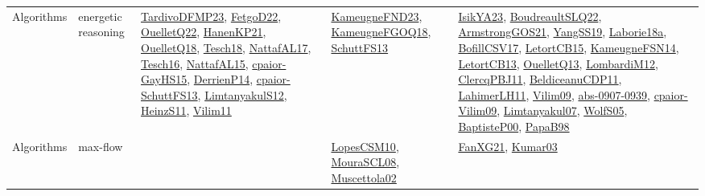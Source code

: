 {\begin{longtable}{lp{3cm}>{\raggedright}p{6cm}>{\raggedright}p{6cm}p{8cm}}
Algorithms & energetic reasoning & \href{papers/TardivoDFMP23.pdf}{TardivoDFMP23}\cite{TardivoDFMP23}, \href{articles/FetgoD22.pdf}{FetgoD22}\cite{FetgoD22}, \href{papers/OuelletQ22.pdf}{OuelletQ22}\cite{OuelletQ22}, \href{papers/HanenKP21.pdf}{HanenKP21}\cite{HanenKP21}, \href{papers/OuelletQ18.pdf}{OuelletQ18}\cite{OuelletQ18}, \href{papers/Tesch18.pdf}{Tesch18}\cite{Tesch18}, \href{articles/NattafAL17.pdf}{NattafAL17}\cite{NattafAL17}, \href{papers/Tesch16.pdf}{Tesch16}\cite{Tesch16}, \href{articles/NattafAL15.pdf}{NattafAL15}\cite{NattafAL15}, \href{papers/cpaior-GayHS15.pdf}{cpaior-GayHS15}\cite{cpaior-GayHS15}, \href{papers/DerrienP14.pdf}{DerrienP14}\cite{DerrienP14}, \href{papers/cpaior-SchuttFS13.pdf}{cpaior-SchuttFS13}\cite{cpaior-SchuttFS13}, \href{articles/LimtanyakulS12.pdf}{LimtanyakulS12}\cite{LimtanyakulS12}, \href{papers/HeinzS11.pdf}{HeinzS11}\cite{HeinzS11}, \href{papers/Vilim11.pdf}{Vilim11}\cite{Vilim11} & \href{papers/KameugneFND23.pdf}{KameugneFND23}\cite{KameugneFND23}, \href{papers/KameugneFGOQ18.pdf}{KameugneFGOQ18}\cite{KameugneFGOQ18}, \href{papers/SchuttFS13.pdf}{SchuttFS13}\cite{SchuttFS13} & \href{articles/IsikYA23.pdf}{IsikYA23}\cite{IsikYA23}, \href{papers/BoudreaultSLQ22.pdf}{BoudreaultSLQ22}\cite{BoudreaultSLQ22}, \href{papers/ArmstrongGOS21.pdf}{ArmstrongGOS21}\cite{ArmstrongGOS21}, \href{papers/YangSS19.pdf}{YangSS19}\cite{YangSS19}, \href{papers/Laborie18a.pdf}{Laborie18a}\cite{Laborie18a}, \href{papers/BofillCSV17.pdf}{BofillCSV17}\cite{BofillCSV17}, \href{articles/LetortCB15.pdf}{LetortCB15}\cite{LetortCB15}, \href{articles/KameugneFSN14.pdf}{KameugneFSN14}\cite{KameugneFSN14}, \href{papers/LetortCB13.pdf}{LetortCB13}\cite{LetortCB13}, \href{papers/OuelletQ13.pdf}{OuelletQ13}\cite{OuelletQ13}, \href{articles/LombardiM12.pdf}{LombardiM12}\cite{LombardiM12}, \href{papers/ClercqPBJ11.pdf}{ClercqPBJ11}\cite{ClercqPBJ11}, \href{articles/BeldiceanuCDP11.pdf}{BeldiceanuCDP11}\cite{BeldiceanuCDP11}, \href{papers/LahimerLH11.pdf}{LahimerLH11}\cite{LahimerLH11}, \href{papers/Vilim09.pdf}{Vilim09}\cite{Vilim09}, \href{articles/abs-0907-0939.pdf}{abs-0907-0939}\cite{abs-0907-0939}, \href{papers/cpaior-Vilim09.pdf}{cpaior-Vilim09}\cite{cpaior-Vilim09}, \href{papers/Limtanyakul07.pdf}{Limtanyakul07}\cite{Limtanyakul07}, \href{papers/WolfS05.pdf}{WolfS05}\cite{WolfS05}, \href{articles/BaptisteP00.pdf}{BaptisteP00}\cite{BaptisteP00}, \href{articles/PapaB98.pdf}{PapaB98}\cite{PapaB98}\\
Algorithms & max-flow &  & \href{articles/LopesCSM10.pdf}{LopesCSM10}\cite{LopesCSM10}, \href{papers/MouraSCL08.pdf}{MouraSCL08}\cite{MouraSCL08}, \href{papers/Muscettola02.pdf}{Muscettola02}\cite{Muscettola02} & \href{articles/FanXG21.pdf}{FanXG21}\cite{FanXG21}, \href{papers/Kumar03.pdf}{Kumar03}\cite{Kumar03}\\

\end{longtable}}
